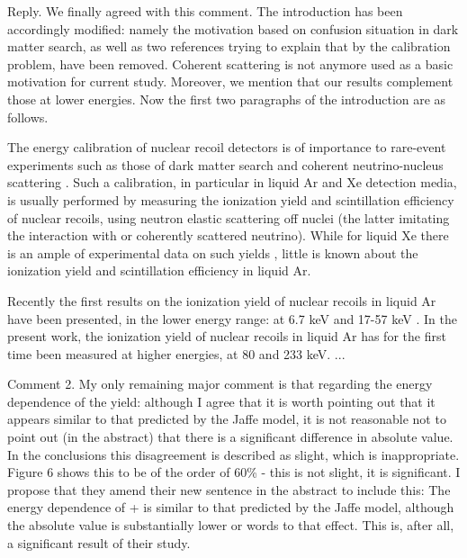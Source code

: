 \documentclass[page-classic]{epl2}
\begin{document}
\vspace{0.5 cm}

Reply. We finally agreed with this comment. The introduction has
been accordingly modified: namely the motivation based on confusion
situation in dark matter search, as well as two references trying to
explain that by the calibration problem, have been removed. Coherent
scattering is not anymore used as a basic motivation for current
study. Moreover, we mention that our results complement those at
lower energies. Now the first two paragraphs of the introduction are
as follows.

\vspace{0.5 cm}

The energy calibration of nuclear recoil detectors is of
 importance to rare-event experiments
\cite{NobleRev} such as those of  dark matter
search
\cite{Xenon10,Xenon100,Zeplin3,Warp,Lux,ArDM,Darkside,Dama,Cogent,Crest,Cdms}
and coherent neutrino-nucleus scattering \cite{CoNu1,CoNu2}. Such a
calibration, in particular in liquid Ar and Xe detection media, is
usually performed by measuring the ionization yield and
scintillation efficiency of nuclear recoils, using neutron elastic
scattering off nuclei (the latter imitating the interaction with
 or coherently scattered neutrino).
While for liquid Xe there is an ample of experimental data on such
yields \cite{LXeYield1,LXeYield2,LXeYield3}, little is known  about
the ionization yield \cite{Joshi,Cao} and scintillation efficiency
\cite{LArScint} in liquid Ar.

Recently the first results on the ionization yield of nuclear
recoils in liquid Ar have been presented, in the lower energy range:
at 6.7 keV \cite{Joshi} and 17-57 keV \cite{Cao}. In the present
work, the ionization yield of nuclear recoils in liquid Ar has for
the first time been measured at higher energies, at 80 and 233 keV.
 ...

\vspace{0.5 cm}

Comment 2. My only remaining major comment is that regarding the
energy dependence of the yield:  although I agree that it is worth
pointing out that it appears similar to that predicted by the Jaffe
model, it is not reasonable not to point out (in the abstract) that
there is a significant difference in absolute value. In the
conclusions this disagreement is described as slight, which is
inappropriate. Figure 6 shows this to be of the order of 60\% - this
is not slight, it is significant. I propose that they amend their
new sentence in the abstract to include this: The energy dependence
of + is similar to that predicted by the Jaffe model, although the
absolute value is substantially lower or words to that effect. This
is, after all, a significant result of their study.
\end{document}
